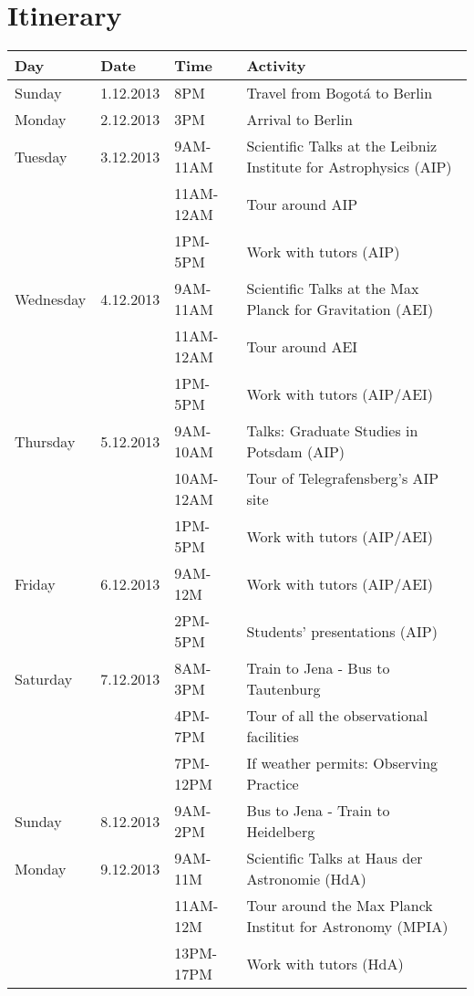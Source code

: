 \documentclass[12pt]{article}
\begin{document}
\section{Itinerary}

\begin{tabular}{p{2cm}p{2cm}p{2.5cm}p{7.0cm}}
Day & Date & Time & Activity\\\hline\hline

Sunday & 1.12.2013 & 8PM&	Travel from Bogot\'a to Berlin\\\hline

Monday &2.12.2013& 3PM & Arrival to Berlin\\\hline

Tuesday &3.12.2013& 9AM-11AM & Scientific Talks at the Leibniz Institute for Astrophysics (AIP)\\
 & & 11AM-12AM &Tour around AIP\\
 & & 1PM-5PM & Work with tutors (AIP)\\\hline

Wednesday &4.12.2013& 9AM-11AM &Scientific Talks at the Max Planck
for Gravitation (AEI)\\
 & & 11AM-12AM &Tour around AEI\\
 & & 1PM-5PM & Work with tutors (AIP/AEI)\\\hline

Thursday &5.12.2013 &  9AM-10AM & Talks: Graduate Studies in Potsdam (AIP)\\
& &  10AM-12AM & Tour of Telegrafensberg's AIP site\\
& & 1PM-5PM& Work with tutors (AIP/AEI)\\ \hline

Friday &6.12.2013& 9AM-12M & Work with tutors (AIP/AEI) \\		
      & & 2PM-5PM&  Students' presentations (AIP)\\\hline

Saturday & 7.12.2013& 8AM-3PM&	Train to Jena - Bus to Tautenburg\\
 & &4PM-7PM & Tour of all the observational facilities\\
 & &7PM-12PM & If weather permits: Observing Practice\\\hline

Sunday &8.12.2013& 9AM-2PM & Bus to Jena - Train to Heidelberg\\\hline

Monday &9.12.2013  & 9AM-11M & Scientific Talks at Haus der
Astronomie (HdA)\\ 
&  & 11AM-12M  & Tour around the Max Planck Institut for Astronomy (MPIA)\\
 & & 13PM-17PM & Work with tutors (HdA)\\\hline


\end{tabular}
\end{document}
